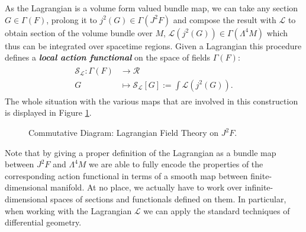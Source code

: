 As the Lagrangian is a volume form valued bundle map, we can take any section $G \in \Gamma(F)$, prolong it to $j^2(G) \in \Gamma(J^2F)$ and compose the result with $\mathcal{L}$ to obtain section of the volume bundle over $M$, $\mathcal{L}(j^2(G)) \in \Gamma(\Lambda^4M)$ which thus can be integrated over spacetime regions. Given a Lagrangian this procedure defines a \textit{\textbf{local action functional}} on the space of fields $\Gamma(F)$:
\begin{align}
\begin{aligned}
    \mathcal{S}_{\mathcal{L}} : \Gamma(F) &\longrightarrow \mathcal{R} \\
    G &\longmapsto \mathcal{S}_{\mathcal{L}}[G] := \int \mathcal{L}(j^2(G)).
\end{aligned}
\end{align}
The whole situation with the various maps that are involved in this construction is displayed in Figure \ref{diagram1}. 
\begin{figure}[hbt!]
\centering
{}
\caption{Commutative Diagram: Lagrangian Field Theory on $J^2F$.} \label{diagram1}
\end{figure}
Note that by giving a proper definition of the Lagrangian as a bundle map between $J^2F$ and $\Lambda^4M$ we are able to fully encode the properties of the corresponding action functional in terms of a smooth map between finite-dimensional manifold. At no place, we actually have to work over infinite-dimensional spaces of sections and functionals defined on them. In particular, when working with the Lagrangian $\mathcal{L}$ we can apply the standard techniques of differential geometry. 
